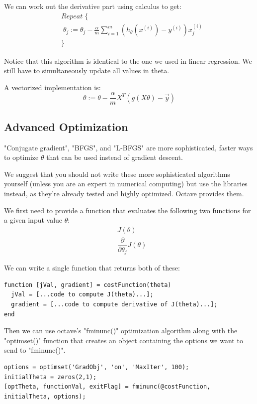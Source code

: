 \documentclass{article}
\begin{document}
We can work out the derivative part using calculus to get:
\begin{align*} 
	& Repeat \; \lbrace \\ 
	& \; \theta_j := \theta_j - \frac{\alpha}{m} \sum_{i=1}^m (h_\theta(x^{(i)}) - y^{(i)}) x_j^{(i)} \\ 
	& \rbrace 
\end{align*}

Notice that this algorithm is identical to the one we used in linear regression. We still have to simultaneously update all values in theta.

A vectorized implementation is:
$$\theta := \theta - \frac{\alpha}{m} X^{T} (g(X \theta ) - \vec{y})$$

\subsection{Advanced Optimization}
"Conjugate gradient", "BFGS", and "L-BFGS" are more sophisticated, faster ways to optimize $\theta$ that can be used instead of gradient descent. 

We suggest that you should not write these more sophisticated algorithms yourself (unless you are an expert in numerical computing) but use the libraries instead, as they're already tested and highly optimized. Octave provides them.

We first need to provide a function that evaluates the following two functions for a given input value $\theta$:
\begin{align*} 
	& J(\theta) \\ 
	& \dfrac{\partial}{\partial \theta_j}J(\theta)
\end{align*}

We can write a single function that returns both of these:
\lstset{style=mystyle}
\begin{lstlisting}
function [jVal, gradient] = costFunction(theta)
  jVal = [...code to compute J(theta)...];
  gradient = [...code to compute derivative of J(theta)...];
end
\end{lstlisting}

Then we can use octave's "fminunc()" optimization algorithm along with the "optimset()" function that creates an object containing the options we want to send to "fminunc()".
\begin{lstlisting}
options = optimset('GradObj', 'on', 'MaxIter', 100);
initialTheta = zeros(2,1);
[optTheta, functionVal, exitFlag] = fminunc(@costFunction, initialTheta, options);
\end{lstlisting}
\end{document}
